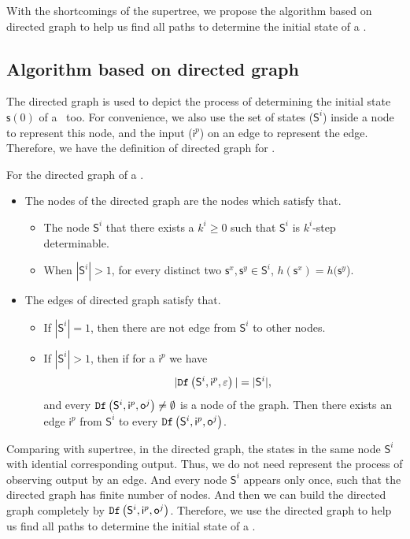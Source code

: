  
With the shortcomings of the supertree, we propose the algorithm based on directed graph to help us find all paths to determine the initial state of a \BCN.
\subsection{Algorithm based on directed graph}
The directed graph is used to depict the process of determining the initial state $\mathsf{s}(0)$ of a \BCN\ too. 
For convenience, we also use the set of states ($\mathsf{S}^i$) inside a node to represent this node, and the input ($\mathsf{i}^p$) on an edge to represent the edge.  
Therefore, we have the definition of directed graph for \BCNs.
\begin{definition}
For the directed graph of a \BCN.   
\begin{itemize}
\item The nodes of the directed graph are the nodes which satisfy that.
\begin{itemize}
\item  The node $\mathsf{S}^i$ that there exists a $k^{i}\ge0$ such that $\mathsf{S}^i$ is $k^{i}$-step determinable.
\item When $|\mathsf{S}^i|>1$, for every distinct two $\mathsf{s}^x, \mathsf{s}^y \in \mathsf{S}^i$, $h(\mathsf{s}^x)=h(\mathsf{s}^y$). 
 \end{itemize}

\item The edges of directed graph satisfy that.
\begin{itemize}
 \item If $|\mathsf{S}^i|=1$, then there are not edge from $\mathsf{S}^i$ to other nodes.
 \item  If $|\mathsf{S}^i|>1$, then if for a $\mathsf{i}^p$ we have \[|{\tt Df}\left(\mathsf{S}^i,\mathsf{i}^p,\varepsilon\right)|=|\mathsf{S}^i|,\] and every ${\tt Df}\left(\mathsf{S}^i,\mathsf{i}^{p},\mathsf{o}^{j}\right)\ne\emptyset$ is a node of the graph. Then there exists an edge $\mathsf{i}^p$ from $\mathsf{S}^i$ to every ${\tt Df}\left(\mathsf{S}^i,\mathsf{i}^{p},\mathsf{o}^{j}\right)$.

 \end{itemize}
 \end{itemize}
\end{definition}

Comparing with supertree, in the directed graph, the states in the same node $\mathsf{S}^i$ with idential corresponding output. Thus, we do not need represent the process of observing output by an edge. And every node $\mathsf{S}^i$ appears only once, such that the directed graph has finite number of nodes. And then we can build the directed graph completely by ${\tt Df}\left(\mathsf{S}^i,\mathsf{i}^{p},\mathsf{o}^{j}\right)$. Therefore, we use the directed graph to help us find all paths to determine the initial state of a \BCN.

